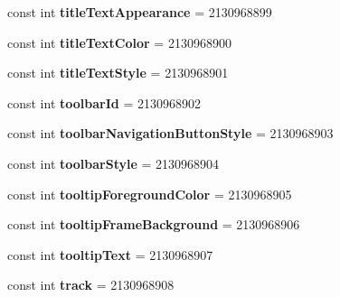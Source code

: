 \begin{DoxyCompactItemize}
const int {\bfseries title\+Text\+Appearance} = 2130968899
\item 
\mbox{\label{classst_delivery_1_1_resource_1_1_attribute_aa74ec9b9bf352aa1ab956b79d8cda9ef}} 
const int {\bfseries title\+Text\+Color} = 2130968900
\item 
\mbox{\label{classst_delivery_1_1_resource_1_1_attribute_a49e7766e581556c4ff1076dc2cf08d6b}} 
const int {\bfseries title\+Text\+Style} = 2130968901
\item 
\mbox{\label{classst_delivery_1_1_resource_1_1_attribute_ae746783c9ef8bdb5ab2139721411697f}} 
const int {\bfseries toolbar\+Id} = 2130968902
\item 
\mbox{\label{classst_delivery_1_1_resource_1_1_attribute_ad7aae583e33f02955afb164f2a7a844c}} 
const int {\bfseries toolbar\+Navigation\+Button\+Style} = 2130968903
\item 
\mbox{\label{classst_delivery_1_1_resource_1_1_attribute_a30d573e47109f806bc12d33eadf5a199}} 
const int {\bfseries toolbar\+Style} = 2130968904
\item 
\mbox{\label{classst_delivery_1_1_resource_1_1_attribute_ae78ce3ddaf50b7f7cd8e98bf62058c79}} 
const int {\bfseries tooltip\+Foreground\+Color} = 2130968905
\item 
\mbox{\label{classst_delivery_1_1_resource_1_1_attribute_a08134af351838d5a44d3b5cf06981dde}} 
const int {\bfseries tooltip\+Frame\+Background} = 2130968906
\item 
\mbox{\label{classst_delivery_1_1_resource_1_1_attribute_aa801c7a4fce857a065ad0bb0ab63579c}} 
const int {\bfseries tooltip\+Text} = 2130968907
\item 
\mbox{\label{classst_delivery_1_1_resource_1_1_attribute_a8ea9d7cad11b155cc84f8b52e06bc8f9}} 
const int {\bfseries track} = 2130968908

\end{DoxyCompactItemize}
